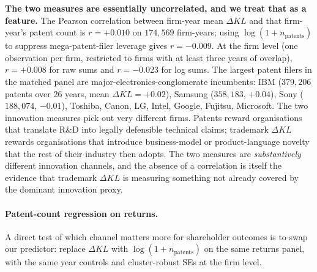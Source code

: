 \documentclass[11pt]{article}
\begin{document}
\begin{table}[h]
\centering
\caption{Convergent-validity correlations between trademark
$\Delta KL$ and patent counts on the matched panel. Column ``N'' is
firm-years (top two rows) or firms (bottom two rows).}
\label{tab:patent-compare}

\end{table}

\textbf{The two measures are essentially uncorrelated, and we treat
that as a feature.} The Pearson correlation between firm-year mean
$\Delta KL$ and that firm-year's patent count is $r = +0.010$ on
$174{,}569$ firm-years; using $\log(1 + n_{\text{patents}})$ to
suppress mega-patent-filer leverage gives $r = -0.009$. At the firm
level (one observation per firm, restricted to firms with at least
three years of overlap), $r = +0.008$ for raw sums and $r = -0.023$
for log sums. The largest patent filers in the matched panel are
major-electronics-conglomerate incumbents: IBM ($379{,}206$ patents
over 26 years, mean $\Delta KL = +0.02$), Samsung ($358{,}183$,
$+0.04$), Sony ($188{,}074$, $-0.01$), Toshiba, Canon, LG, Intel,
Google, Fujitsu, Microsoft. The two innovation measures pick out
very different firms. Patents reward organisations that translate
R\&D into legally defensible technical claims; trademark $\Delta KL$
rewards organisations that introduce business-model or product-language
novelty that the rest of their industry then adopts. The two
measures are \emph{substantively} different innovation channels, and
the absence of a correlation is itself the evidence that
trademark $\Delta KL$ is measuring something not already covered by
the dominant innovation proxy.

\paragraph{Patent-count regression on returns.}
A direct test of which channel matters more for shareholder
outcomes is to swap our predictor: replace $\Delta KL$ with
$\log(1 + n_{\text{patents}})$ on the same returns panel, with the
same year controls and cluster-robust SEs at the firm level.

\begin{table}[h]
\centering
\caption{Excess-return regression with $\log(1 + n_{\text{patents}})$
as the firm-year predictor (z-scored). Same panel and specification
as the firm-year row of Table~\ref{tab:returns}.}
\label{tab:patent-returns}

\end{table}
\end{document}
